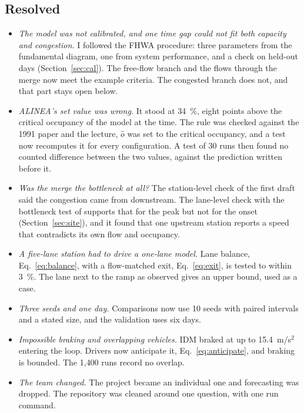 \documentclass[11pt,letterpaper]{article}
\begin{document}
\subsection{Resolved}
\begin{itemize}
\item \emph{The model was not calibrated, and one time gap could not fit both capacity
  and congestion.} I followed the FHWA procedure: three parameters from the fundamental
  diagram, one from system performance, and a check on held-out days
  (Section~\ref{sec:cal}). The free-flow branch and the flows through the merge now meet
  the example criteria. The congested branch does not, and that part stays open below.
\item \emph{ALINEA's set value was wrong.} It stood at 34~\%, eight points above the
  critical occupancy of the model at the time. The rule was checked against the 1991
  paper and the lecture, $\hat o$ was set to the critical occupancy, and a test now
  recomputes it for every configuration. A test of 30 runs then found no counted
  difference between the two values, against the prediction written before it.
\item \emph{Was the merge the bottleneck at all?} The station-level check of the first
  draft said the congestion came from downstream. The lane-level check with the
  bottleneck test of \cite{chen2004} supports that for the peak but not for the onset
  (Section~\ref{sec:site}), and it found that one upstream station reports a speed that
  contradicts its own flow and occupancy.
\item \emph{A five-lane station had to drive a one-lane model.} Lane balance,
  Eq.~\eqref{eq:balance}, with a flow-matched exit, Eq.~\eqref{eq:exit}, is tested to
  within 3~\%. The lane next to the ramp as observed gives an upper bound, used as a
  case.
\item \emph{Three seeds and one day.} Comparisons now use 10 seeds with paired
  intervals and a stated size, and the validation uses six days.
\item \emph{Impossible braking and overlapping vehicles.} IDM braked at up to
  15.4~m/s$^2$ entering the loop. Drivers now anticipate it,
  Eq.~\eqref{eq:anticipate}, and braking is bounded. The 1{,}400 runs record no
  overlap.
\item \emph{The team changed.} The project became an individual one and forecasting was
  dropped. The repository was cleaned around one question, with one run command.
\end{itemize}
\end{document}
